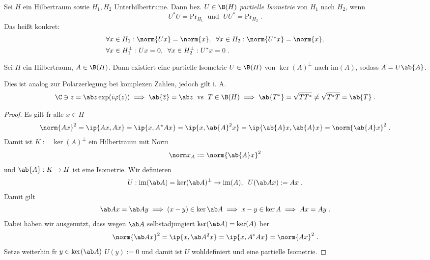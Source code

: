 \begin{definition}
	Sei $H$ ein Hilbertraum sowie \(H_1, H_2\) Unterhilbertr\as ume. Dann bez. \(U\in \B(H)\) \textit{partielle Isometrie} von $H_1$ nach $H_2$, wenn 
	\[U^*U = \text{Pr}_{H_1} \;\text{ und }\; UU^* = \text{Pr}_{H_2}\;.\]
	Das hei\ss{}t konkret:
	\begin{align*}&\forall x\in H_1: \norm{Ux} = \norm{x},\;\;\forall x \in H_2: \norm{U^*x} = \norm{x},\\
		&\forall x \in H_1^{\perp}: Ux = 0,\;\; \forall x \in H_2^\perp: U^*x = 0\;.\end{align*}
\end{definition}
\begin{theorem}
	Sei $H$ ein Hilbertraum, \(A\in \B(H)\). Dann existiert eine partielle Isometrie \(U\in \B(H)\) von \(\ker(A)^\perp \) nach \(\text{im}(A)\), sodass \(A = U \ab{A}\).
	\label{part_isom}
\end{theorem}
\begin{rem}
	Dies ist analog zur Polarzerlegung bei komplexen Zahlen, jedoch gilt i. A. 
	\[\C\ni z = \ab z \exp(i\varphi(z))\implies \ab{\overline z} = \ab z \;\text{ vs }\; T \in \B(H) \implies \ab{T^*} = \sqrt{TT^*} \neq \sqrt{T^*T} = \ab{T}\;.\]
\end{rem}
\begin{proof}
	Es gilt f\us r alle \(x\in H\)
	\[\norm{Ax}^2 = \ip{Ax, Ax} = \ip{x, A^*Ax} = \ip{x, \ab{A}^2 x} = \ip{\ab{A}x, \ab{A}x} = \norm{\ab{A}x}^2\;.\]
	Damit ist \(K:=\ker(A)^\perp\) ein Hilbertraum mit Norm 
	\[\norm x_A := \norm {\ab{A}x}^2\]
	und \(\ab{A}: K\to H\) ist eine Isometrie. Wir definieren
	\[U: \text{im}(\ab A) = \ker(\ab A)^\perp \to \text{im} (A),\;\; U(\ab A x ) := Ax\;.\]
	Damit gilt
	\[\ab A x = \ab A y \implies (x-y) \in \ker \ab A \implies x-y \in \ker A \implies Ax = Ay\;.\]
	Dabei haben wir ausgenutzt, dass wegen $\ab A$ selbstadjungiert \(\ker(\ab A) = \ker(A)\) \us ber
	\[\norm{\ab A x}^2 = \ip{x, \ab A^2 x} = \ip{x, A^*Ax}= \norm{Ax}^2\;. \]
	Setze weiterhin f\us r \(y\in \ker(\ab A)\)  \(U(y):=0\) und damit ist $U$ wohldefiniert und eine partielle Isometrie.
\end{proof}

